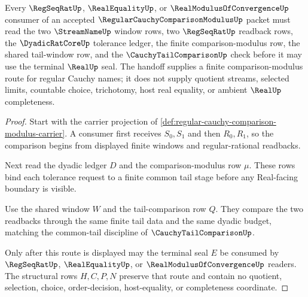 \begin{theorem}
\label{thm:regular-cauchy-comparison-modulus-regseqrat-handoff}
Every $\RegSeqRatUp$, $\RealEqualityUp$, or $\RealModulusOfConvergenceUp$ consumer of an accepted $\RegularCauchyComparisonModulusUp$ packet must read the two $\StreamNameUp$ window rows, two $\RegSeqRatUp$ readback rows, the $\DyadicRatCoreUp$ tolerance ledger, the finite comparison-modulus row, the shared tail-window row, and the $\CauchyTailComparisonUp$ check before it may use the terminal $\RealUp$ seal. The handoff supplies a finite comparison-modulus route for regular Cauchy names; it does not supply quotient streams, selected limits, countable choice, trichotomy, host real equality, or ambient $\RealUp$ completeness.
\end{theorem}
\begin{proof}
Start with the carrier projection of \autoref{def:regular-cauchy-comparison-modulus-carrier}. A consumer first receives $S_0,S_1$ and then $R_0,R_1$, so the comparison begins from displayed finite windows and regular-rational readbacks.

Next read the dyadic ledger $D$ and the comparison-modulus row $\mu$. These rows bind each tolerance request to a finite common tail stage before any Real-facing boundary is visible.

Use the shared window $W$ and the tail-comparison row $Q$. They compare the two readbacks through the same finite tail data and the same dyadic budget, matching the common-tail discipline of $\CauchyTailComparisonUp$.

Only after this route is displayed may the terminal seal $E$ be consumed by $\RegSeqRatUp$, $\RealEqualityUp$, or $\RealModulusOfConvergenceUp$ readers. The structural rows $H,C,P,N$ preserve that route and contain no quotient, selection, choice, order-decision, host-equality, or completeness coordinate.
\end{proof}


